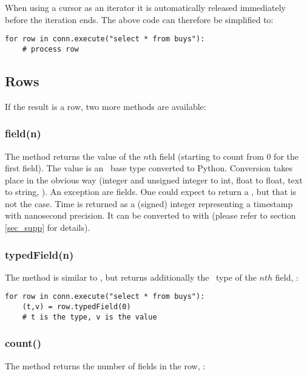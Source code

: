 When using a cursor as an iterator
it is automatically released immediately
before the iteration ends.
The above code can therefore be simplified to:

\begin{python}
\begin{lstlisting}
for row in conn.execute("select * from buys"):
    # process row
\end{lstlisting}
\end{python}

\subsection{Rows}
If the result is a row,
two more methods are available:

\subsubsection{field(n)}
The method returns the value
of the $n$th field (starting to count
from 0 for the first field).
The value is an \sql\ base type
converted to Python.
Conversion takes place in the obvious way
(integer and unsigned integer to int,
 float to float, text to string, \etc).
An exception are  fields.
One could expect  to return
a , but that is not the case.
Time is returned as a (signed) integer
representing a  timestamp
with nanosecond precision.
It can be converted to  with 
(please refer to section \ref{sec_supp}
for details).

\subsubsection{typedField(n)}
The method is similar to ,
but returns additionally the \nowdb\ type
of the $nth$ field, \eg:

\begin{python}
\begin{lstlisting}
for row in conn.execute("select * from buys"):
    (t,v) = row.typedField(0)
    # t is the type, v is the value
\end{lstlisting}
\end{python}

\subsubsection{count()}
The method returns the number of fields in the row, \eg:

